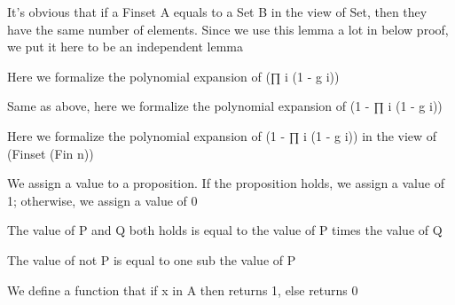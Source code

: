 \begin{lemma}\label{card_eq}
                It's obvious that if a Finset A equals to a Set B in the view of Set, then they have the same number of elements. Since we use this lemma a lot in below proof, we put it here to be an independent lemma
    \end{lemma}

\begin{lemma}\label{mul_expand₃}
                Here we formalize the polynomial expansion of (∏ i (1 - g i))
    \end{lemma}

\begin{lemma}\label{mul_expand₂}
                Same as above, here we formalize the polynomial expansion of (1 - ∏ i (1 - g i))
    \end{lemma}

\begin{lemma}\label{mul_expand₁}
                Here we formalize the polynomial expansion of (1 - ∏ i (1 - g i)) in the view of (Finset (Fin n))
    \end{lemma}

\begin{definition}\label{toInt}
        \leanok
                We assign a value to a proposition. If the proposition holds, we assign a value of 1; otherwise, we assign a value of 0
    \end{definition}

\begin{lemma}\label{toInt_and}
                The value of P and Q both holds is equal to the value of P times the value of Q
    \end{lemma}

\begin{lemma}\label{toInt_not}
                The value of not P is equal to one sub the value of P
    \end{lemma}

\begin{definition}\label{char_fun}
        \leanok
                We define a function that if x in A then returns 1, else returns 0
    \end{definition}

